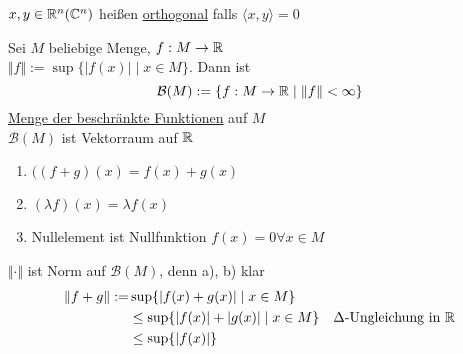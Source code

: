 \begin{mydefn}[Orthogonalität]
    $x,y \in \mathbb{R}^n(\mathbb{C}^n)$ heißen \underline{orthogonal} falls $\langle x,y\rangle =0$
\end{mydefn}

\begin{exmpn}
    Sei $M$ beliebige Menge, $f: M \to \mathbb{R}$\\
    $\Vert f\Vert:= \sup\{\vert f(x) \vert \mid x\in M\}$. Dann ist \\
    \[\mathcal{B}(M):= \{f: M \to \mathbb{R} \mid \Vert f\Vert < \infty\}\]
    \underline{Menge der beschränkte Funktionen} auf $M$\\
    $\mathcal{B}(M)$ ist Vektorraum auf $\mathbb{R}$
    \begin{enumerate}[label={\alph*)}]
        \item $((f+g)(x) = f(x) + g(x)$
        \item $(\lambda f)(x) = \lambda f(x)$
        \item Nullelement ist Nullfunktion $f(x)=0 \forall x \in M$
    \end{enumerate}
    $\Vert \cdot\Vert$ ist Norm auf $\mathcal{B}(M)$, denn a), b) klar\\
    \begin{align*}
        \Vert f+g\Vert:=&\sup\{\vert f(x)+g(x) \vert\mid x \in M\}&\\
        &\leq \sup\{\vert f(x) \vert + \vert g(x) \vert\mid x\in M \} & \Delta\text{-Ungleichung in }\mathbb{R}\\
        &\leq \sup\{\vert f(x) \vert \}
    \end{align*}
\end{exmpn}



